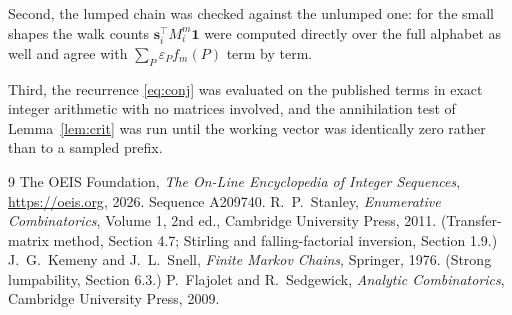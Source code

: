 \documentclass[11pt,a4paper]{article}
\theoremstyle{plain}
\theoremstyle{definition}
\begin{document}
Second, the lumped chain was checked against the unlumped one: for the small shapes the walk
counts $\mathbf{s}_i^{\!\top}M_i^{m}\mathbf{1}$ were computed directly over the full
alphabet as well and agree with $\sum_P\varepsilon_Pf_m(P)$ term by term.

Third, the recurrence \eqref{eq:conj} was evaluated on the published terms in exact integer
arithmetic with no matrices involved, and the annihilation test of Lemma~\ref{lem:crit} was
run until the working vector was identically zero rather than to a sampled prefix.

\begin{thebibliography}{9}
 The OEIS Foundation, \emph{The On-Line Encyclopedia of Integer
Sequences}, \url{https://oeis.org}, 2026. Sequence A209740.
 R.~P.~Stanley, \emph{Enumerative Combinatorics}, Volume 1, 2nd ed.,
Cambridge University Press, 2011. (Transfer-matrix method, Section 4.7; Stirling and
falling-factorial inversion, Section 1.9.)
 J.~G.~Kemeny and J.~L.~Snell, \emph{Finite Markov Chains}, Springer,
1976. (Strong lumpability, Section 6.3.)
 P.~Flajolet and R.~Sedgewick, \emph{Analytic Combinatorics}, Cambridge
University Press, 2009.
\end{thebibliography}
\end{document}
